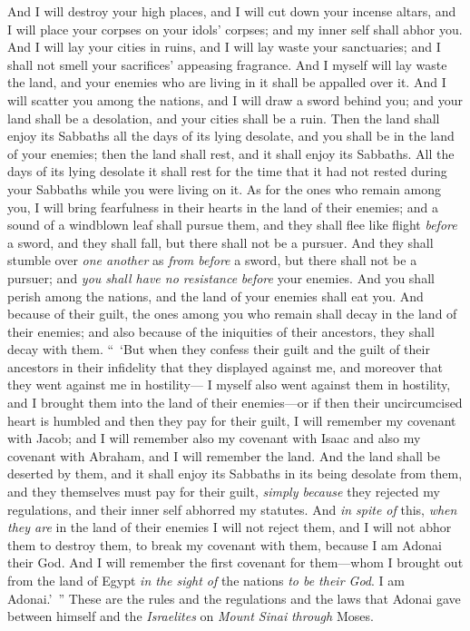 \begin{biblechapter}
\verse And I will destroy your high places, and I will cut down your incense altars, and I will place your corpses on your idols’ corpses; and my inner self shall abhor you.
\verse And I will lay your cities in ruins, and I will lay waste your sanctuaries; and I shall not smell your sacrifices’ appeasing fragrance.
\verse And I myself will lay waste the land, and your enemies who are living in it shall be appalled over it.
\verse And I will scatter you among the nations, and I will draw a sword behind you; and your land shall be a desolation, and your cities shall be a ruin.
\verse Then the land shall enjoy its Sabbaths all the days of its lying desolate, and you shall be in the land of your enemies; then the land shall rest, and it shall enjoy its Sabbaths.
\verse All the days of its lying desolate it shall rest for the time that it had not rested during your Sabbaths while you were living on it.
\verse As for the ones who remain among you, I will bring fearfulness in their hearts in the land of their enemies; and a sound of a windblown leaf shall pursue them, and they shall flee like flight \textit{before} a sword, and they shall fall, but there shall not be a pursuer.
\verse And they shall stumble over \textit{one another} as \textit{from before} a sword, but there shall not be a pursuer; and \textit{you shall have no resistance} \textit{before} your enemies.
\verse And you shall perish among the nations, and the land of your enemies shall eat you.
\verse And because of their guilt, the ones among you who remain shall decay in the land of their enemies; and also because of the iniquities of their ancestors, they shall decay with them.
\verse “ ‘But when they confess their guilt and the guilt of their ancestors in their infidelity that they displayed against me, and moreover that they went against me in hostility—
\verse I myself also went against them in hostility, and I brought them into the land of their enemies—or if then their uncircumcised heart is humbled and then they pay for their guilt,
\verse I will remember my covenant with Jacob; and I will remember also my covenant with Isaac and also my covenant with Abraham, and I will remember the land.
\verse And the land shall be deserted by them, and it shall enjoy its Sabbaths in its being desolate from them, and they themselves must pay for their guilt, \textit{simply because} they rejected my regulations, and their inner self abhorred my statutes.
\verse And \textit{in spite of} this, \textit{when they are} in the land of their enemies I will not reject them, and I will not abhor them to destroy them, to break my covenant with them, because I am Adonai their God.
\verse And I will remember the first covenant for them—whom I brought out from the land of Egypt \textit{in the sight of} the nations \textit{to be their God}. I am Adonai.’ ”
\verse These are the rules and the regulations and the laws that Adonai gave between himself and the \textit{Israelites} on \textit{Mount Sinai} \textit{through} Moses.
\end{biblechapter}

